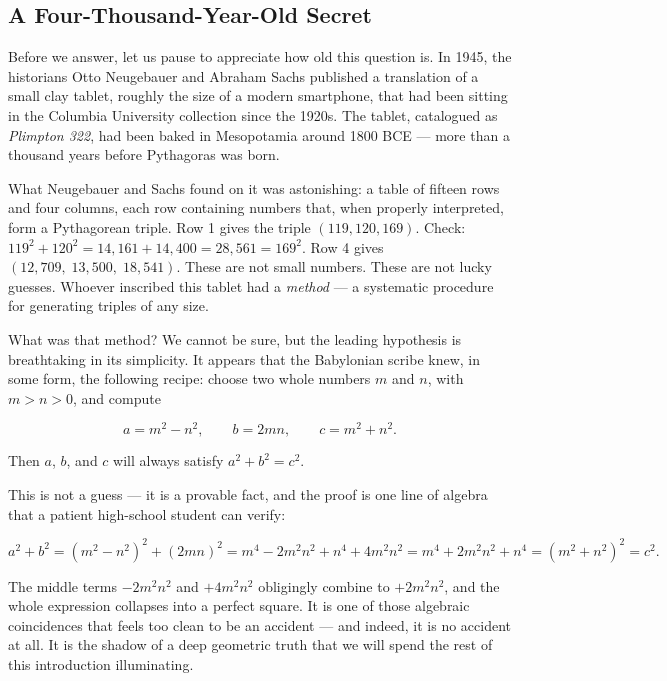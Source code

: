 \documentclass[11pt,openright,twoside]{book}
\theoremstyle{definition}
\begin{document}
\bigskip


\subsection{A Four-Thousand-Year-Old Secret}

Before we answer, let us pause to appreciate how old this question is. In 1945, the historians Otto Neugebauer and Abraham Sachs published a translation of a small clay tablet, roughly the size of a modern smartphone, that had been sitting in the Columbia University collection since the 1920s. The tablet, catalogued as \textit{Plimpton 322}, had been baked in Mesopotamia around 1800 BCE --- more than a thousand years before Pythagoras was born.

What Neugebauer and Sachs found on it was astonishing: a table of fifteen rows and four columns, each row containing numbers that, when properly interpreted, form a Pythagorean triple. Row 1 gives the triple $(119, 120, 169)$. Check: $119^2 + 120^2 = 14{,}161 + 14{,}400 = 28{,}561 = 169^2$. Row 4 gives $(12{,}709,\; 13{,}500,\; 18{,}541)$. These are not small numbers. These are not lucky guesses. Whoever inscribed this tablet had a \textit{method} --- a systematic procedure for generating triples of any size.

What was that method? We cannot be sure, but the leading hypothesis is breathtaking in its simplicity. It appears that the Babylonian scribe knew, in some form, the following recipe: choose two whole numbers $m$ and $n$, with $m > n > 0$, and compute

\[a = m^2 - n^2, \qquad b = 2mn, \qquad c = m^2 + n^2.\]

Then $a$, $b$, and $c$ will always satisfy $a^2 + b^2 = c^2$.

This is not a guess --- it is a provable fact, and the proof is one line of algebra that a patient high-school student can verify:

\[a^2 + b^2 = (m^2 - n^2)^2 + (2mn)^2 = m^4 - 2m^2 n^2 + n^4 + 4m^2 n^2 = m^4 + 2m^2 n^2 + n^4 = (m^2 + n^2)^2 = c^2.\]

The middle terms $-2m^2 n^2$ and $+4m^2 n^2$ obligingly combine to $+2m^2 n^2$, and the whole expression collapses into a perfect square. It is one of those algebraic coincidences that feels too clean to be an accident --- and indeed, it is no accident at all. It is the shadow of a deep geometric truth that we will spend the rest of this introduction illuminating.
\end{document}
